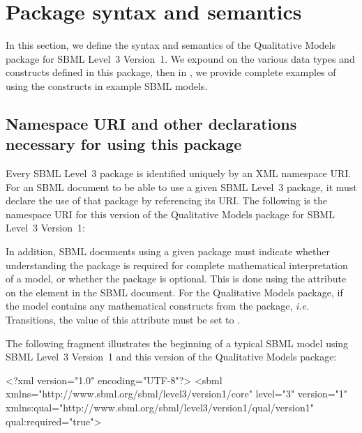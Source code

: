 
\newcommand{\fixttspace}{\hspace*{1pt}}

\section{Package syntax and semantics}

In this section, we define the syntax and semantics of the Qualitative Models package for SBML Level~3 Version~1.  We expound on the
various data types and constructs defined in this package, then in
, we provide complete examples of using the constructs in
example SBML models.

\subsection{Namespace URI and other declarations necessary for using this package}
\label{xml-namespace}

Every SBML Level~3 package is identified uniquely by an XML namespace
URI.  For an SBML document to be able to use a given SBML Level~3
package, it must declare the use of that package by referencing its URI.
The following is the namespace URI for this version of the Qualitative Models package for SBML Level~3 Version~1:
\begin{center}
\end{center}

In addition, SBML documents using a given package must indicate whether
understanding the package is required for complete mathematical
interpretation of a model, or whether the package is optional.  This is
done using the attribute  on the  element
in the SBML document.  For the Qualitative Models package,
if the model contains any mathematical constructs from the package, {\em i.e.} Transitions,  the value of this attribute must be set to .

The following fragment illustrates the beginning of a typical SBML model
using SBML Level~3 Version~1 and this version of the Qualitative Models package:

\begin{example}
<?xml version="1.0" encoding="UTF-8"?>
<sbml xmlns="http://www.sbml.org/sbml/level3/version1/core" level="3" version="1"
      xmlns:qual="http://www.sbml.org/sbml/level3/version1/qual/version1" qual:required="true">
\end{example}
    

